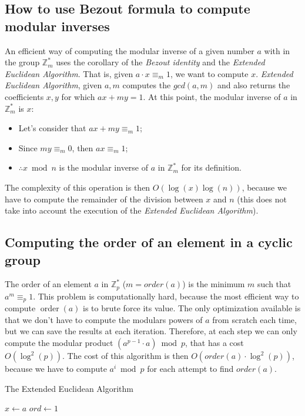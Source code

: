 \subsection{How to use Bezout formula to compute modular inverses}
An efficient way of computing the modular inverse of a given number $a$ with in the group $\mathbb{Z}_{m}^{*}$ uses the corollary of the \emph{Bezout identity} and the \emph{Extended Euclidean Algorithm}.\newline
That is, given $a \cdot x \equiv_{m} 1$, we want to compute $x$.\newline
\emph{Extended Euclidean Algorithm}, given $a, m$ computes the $gcd(a,m)$ and also returns the coefficients $x,y$ for which $ax + my = 1$. \newline
At this point, the modular inverse of $a$ in $\mathbb{Z}_{m}^{*}$ is $x$:
\begin{itemize}
    \item Let's consider that $ax + my \equiv_{m} 1$;
    \item Since $my \equiv_{m} 0$, then $ax \equiv_{m} 1$;
    \item $\therefore x \bmod n$ is the modular inverse of $a$ in $\mathbb{Z}_{m}^{*}$ for its definition.
\end{itemize}
The complexity of this operation is then $O(\operatorname{log}(x)\operatorname{log}(n))$, because we have to compute the remainder of the division between $x$ and $n$ (this does not take into account the execution of the \emph{Extended Euclidean Algorithm}).

\subsection{Computing the order of an element in a cyclic group}
The order of an element $a$ in $\mathbb{Z}_{p}^{*}$ ($m = order(a)$) is the minimum $m$ such that $a^{m} \equiv_{p} 1$.\newline
This problem is computationally hard, because the most efficient way to compute $\operatorname{order}(a)$ is to brute force its value.\newline
The only optimization available is that we don't have to compute the modulars powers of $a$ from scratch each time, but we can save the results at each iteration. \newline
Therefore, at each step we can only compute the modular product $(a^{p-1} \cdot a) \bmod p$, that has a cost $O(\operatorname{log}^{2}(p))$.
The cost of this algorithm is then $O(order(a) \cdot \operatorname{log}^{2}(p))$, because we have to compute $a^{i} \bmod p$ for each attempt to find $order(a)$.
\begin{algorithm}
\caption{The Extended Euclidean Algorithm}\label{alg:OrdElemGrp}
$x \gets a$\;
$ord \gets 1$\;
\end{algorithm}

